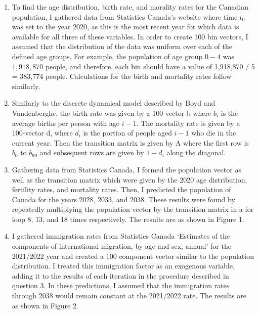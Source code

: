 \documentclass[10pt]{article}
\begin{document}
\noindent{}
\normalsize
\begin{enumerate}[leftmargin=\labelsep]
    \item 
    To find the age distribution, birth rate, and morality rates for the Canadian population, I gathered data from Statistics Canada's website where time
    $t_0$ was set to the year $2020$, as this is the most recent year for which data is available for all three of these variables. In order to
    create 100 bin vectors, I assumed that the distribution of the data was uniform over each of the defined age groups. For example, the population 
    of age group $0-4$ was $1,918,870$ people, and therefore, each bin should have a value of 1,918,870 / 5 = 383,774 people. Calculations for the birth and mortality rates
    follow similarly.
        
    \item Similarly to the discrete dynamical model described by Boyd and Vandenberghe, the birth rate was given by a 100-vector b where $b_i$ is the average births per person with age $i-1$. The mortality
    rate is given by a 100-vector d, where $d_i$ is the portion of people aged $i-1$ who die in the current year. Then the transition matrix is given by A where the first row is $b_0$ to $b_{99}$ and subsequent rows are given by $1-d_i$ along the diagonal.
    
    \item Gathering data from Statistics Canada, I formed the population vector as well as the transition matrix which were given by the 2020 age distribution, fertility rates, and mortality rates. Then, I predicted the population of Canada for the years 2028, 2033, and 2038. These results were found by repeatedly multiplying the population vector by the transition matrix in a for loop 8, 13, and 18 times respectively. The results are as shown in Figure 1.
    
    \item I gathered immigration rates from Statistics Canada `Estimates of the components of international migration, by age and sex, annual' for the 2021/2022 year and created a 100 component vector similar to the population distribution. I treated this immigration factor as an exogenous variable, adding it to the results of each iteration in the procedure described in question 3. In these predictions, I assumed that the immigration rates through 2038 would remain constant at the 2021/2022 rate. The results are as shown in Figure 2.


\end{enumerate}
\end{document}
